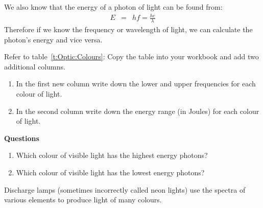 We also know that the energy of a photon of light can be found from:
\begin{eqnarray*}
E & = &hf = \frac{hc}{\lambda} 
\end{eqnarray*}
Therefore if we know the frequency or wavelength of light, we can calculate the photon's energy and vice versa. 

{
\noindent Refer to table~\ref{t:Optic:Colours}: Copy the table into your workbook and add two additional columns.
\begin{enumerate}
\item In the first new column write down the lower and upper frequencies for each colour of light. 
\item In the second column write down the energy range (in Joules) for each colour of light.
\end{enumerate}
\textbf{Questions}\\
\begin{enumerate}
\item Which colour of visible light has the highest energy photons?
\item Which colour of visible light has the lowest energy photons?
\end{enumerate} 
}
Discharge lamps (sometimes incorrectly called neon lights) use the spectra of various elements to produce light of many colours.



